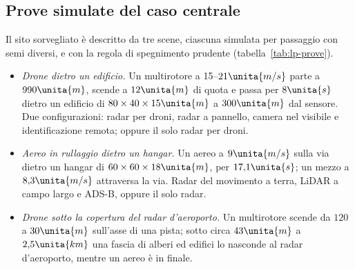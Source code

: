 \subsection{Prove simulate del caso centrale}\label{sec:lp-prove}

Il sito sorvegliato è descritto da tre scene, ciascuna simulata per passaggio con semi diversi, e con la regola di spegnimento prudente (tabella~\ref{tab:lp-prove}).
\begin{itemize}
\item \emph{Drone dietro un edificio.} Un multirotore a 15--$21\unita{m/s}$ parte a $990\unita{m}$, scende a $12\unita{m}$ di quota e passa per $8\unita{s}$ dietro un edificio di $80\times40\times15\unita{m}$ a $300\unita{m}$ dal sensore. Due configurazioni: radar per droni, radar a pannello, camera nel visibile e identificazione remota; oppure il solo radar per droni.
\item \emph{Aereo in rullaggio dietro un hangar.} Un aereo a $9\unita{m/s}$ sulla via dietro un hangar di $60\times60\times18\unita{m}$, per $17{,}1\unita{s}$; un mezzo a $8{,}3\unita{m/s}$ attraversa la via. Radar del movimento a terra, LiDAR a campo largo e ADS-B, oppure il solo radar.
\item \emph{Drone sotto la copertura del radar d'aeroporto.} Un multirotore scende da $120$ a $30\unita{m}$ sull'asse di una pista; sotto circa $43\unita{m}$ a $2{,}5\unita{km}$ una fascia di alberi ed edifici lo nasconde al radar d'aeroporto, mentre un aereo è in finale.
\end{itemize}

